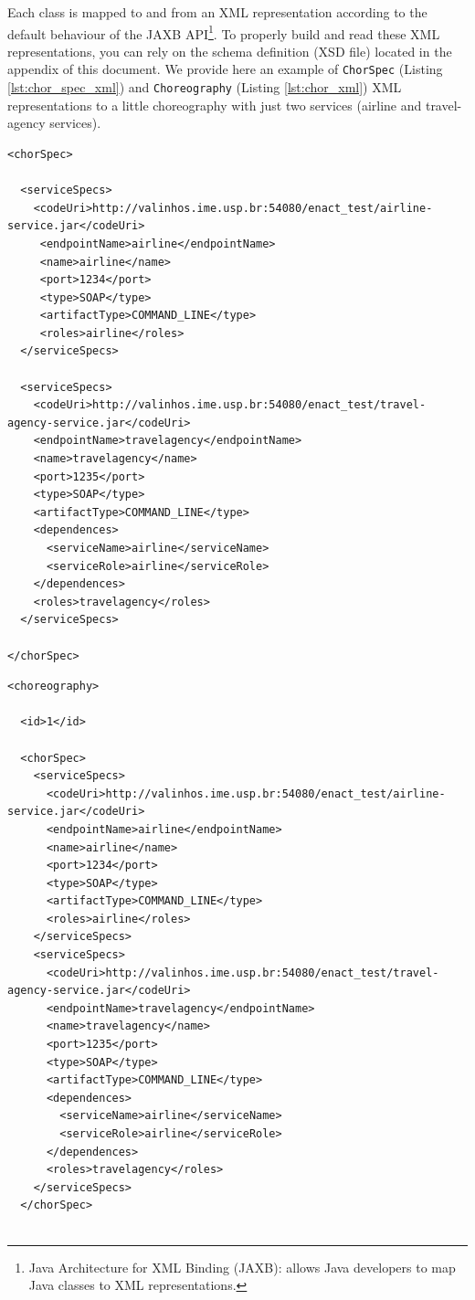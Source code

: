 \documentclass[a4paper, 10pt]{article}
\begin{document}
Each class is mapped to and from an XML representation according to the default behaviour of the JAXB API\footnote{Java Architecture for XML Binding (JAXB): allows Java developers to map Java classes to XML representations.}. 
To properly build and read these XML representations, you can rely on the schema definition (XSD file) located in the appendix of this document. We provide here an example of \verb!ChorSpec! (Listing \ref{lst:chor_spec_xml}) and \verb!Choreography! (Listing \ref{lst:chor_xml}) XML representations to a little choreography with just two services (airline and travel-agency services). 

{\footnotesize

\lstset{language=XML}

\begin{lstlisting}[caption=ChorSpec XML representation example, label=lst:chor_spec_xml]
<chorSpec>

  <serviceSpecs>
    <codeUri>http://valinhos.ime.usp.br:54080/enact_test/airline-service.jar</codeUri>
     <endpointName>airline</endpointName>
     <name>airline</name>
     <port>1234</port>
     <type>SOAP</type>
     <artifactType>COMMAND_LINE</type>
     <roles>airline</roles>
  </serviceSpecs>
  
  <serviceSpecs>
    <codeUri>http://valinhos.ime.usp.br:54080/enact_test/travel-agency-service.jar</codeUri>
    <endpointName>travelagency</endpointName>
    <name>travelagency</name>
    <port>1235</port>
    <type>SOAP</type>
    <artifactType>COMMAND_LINE</type>
    <dependences>
      <serviceName>airline</serviceName>
      <serviceRole>airline</serviceRole>
    </dependences>
    <roles>travelagency</roles>
  </serviceSpecs>
  
</chorSpec>
\end{lstlisting}

\begin{lstlisting}[caption=Choreography XML representation example, label=lst:chor_xml]
<choreography>

  <id>1</id>

  <chorSpec>
    <serviceSpecs>
      <codeUri>http://valinhos.ime.usp.br:54080/enact_test/airline-service.jar</codeUri>
      <endpointName>airline</endpointName>
      <name>airline</name>
      <port>1234</port>
      <type>SOAP</type>
      <artifactType>COMMAND_LINE</type>
      <roles>airline</roles>
    </serviceSpecs>
    <serviceSpecs>
      <codeUri>http://valinhos.ime.usp.br:54080/enact_test/travel-agency-service.jar</codeUri>
      <endpointName>travelagency</endpointName>
      <name>travelagency</name>
      <port>1235</port>
      <type>SOAP</type>
      <artifactType>COMMAND_LINE</type>
      <dependences>
        <serviceName>airline</serviceName>
        <serviceRole>airline</serviceRole>
      </dependences>
      <roles>travelagency</roles>
    </serviceSpecs>
  </chorSpec>
  

\end{lstlisting}}
\end{document}
